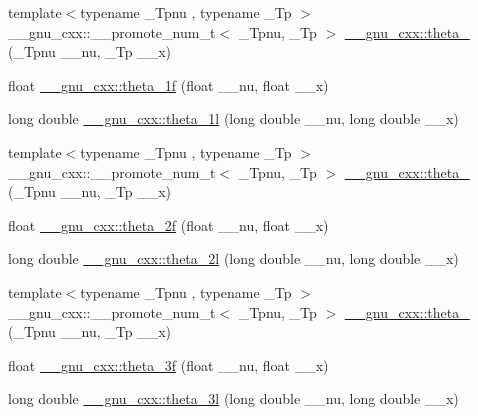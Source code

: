 \begin{DoxyCompactItemize}
\item 
{\footnotesize template$<$typename \+\_\+\+Tpnu , typename \+\_\+\+Tp $>$ }\\\+\_\+\+\_\+gnu\+\_\+cxx\+::\+\_\+\+\_\+promote\+\_\+num\+\_\+t$<$ \+\_\+\+Tpnu, \+\_\+\+Tp $>$ \hyperlink{group__gnu__math__spec__func_ga936eef7d11580bef855f98789bbbfe50}{\+\_\+\+\_\+gnu\+\_\+cxx\+::theta\+\_} (\+\_\+\+Tpnu \+\_\+\+\_\+nu, \+\_\+\+Tp \+\_\+\+\_\+x)
\item 
float \hyperlink{group__gnu__math__spec__func_ga5bbf256b875da28132f9049f5984cb14}{\+\_\+\+\_\+gnu\+\_\+cxx\+::theta\+\_\+1f} (float \+\_\+\+\_\+nu, float \+\_\+\+\_\+x)
\item 
long double \hyperlink{group__gnu__math__spec__func_ga3520684c78771ffa57180060c8b6d1ca}{\+\_\+\+\_\+gnu\+\_\+cxx\+::theta\+\_\+1l} (long double \+\_\+\+\_\+nu, long double \+\_\+\+\_\+x)
\item 
{\footnotesize template$<$typename \+\_\+\+Tpnu , typename \+\_\+\+Tp $>$ }\\\+\_\+\+\_\+gnu\+\_\+cxx\+::\+\_\+\+\_\+promote\+\_\+num\+\_\+t$<$ \+\_\+\+Tpnu, \+\_\+\+Tp $>$ \hyperlink{group__gnu__math__spec__func_ga762aa79fc6c6320d7c6290359a42c2bc}{\+\_\+\+\_\+gnu\+\_\+cxx\+::theta\+\_} (\+\_\+\+Tpnu \+\_\+\+\_\+nu, \+\_\+\+Tp \+\_\+\+\_\+x)
\item 
float \hyperlink{group__gnu__math__spec__func_ga78e832796aedf5159b142801e1184392}{\+\_\+\+\_\+gnu\+\_\+cxx\+::theta\+\_\+2f} (float \+\_\+\+\_\+nu, float \+\_\+\+\_\+x)
\item 
long double \hyperlink{group__gnu__math__spec__func_gac5a30c772d4888442665945e7f3fa017}{\+\_\+\+\_\+gnu\+\_\+cxx\+::theta\+\_\+2l} (long double \+\_\+\+\_\+nu, long double \+\_\+\+\_\+x)
\item 
{\footnotesize template$<$typename \+\_\+\+Tpnu , typename \+\_\+\+Tp $>$ }\\\+\_\+\+\_\+gnu\+\_\+cxx\+::\+\_\+\+\_\+promote\+\_\+num\+\_\+t$<$ \+\_\+\+Tpnu, \+\_\+\+Tp $>$ \hyperlink{group__gnu__math__spec__func_ga1383b7486de1e177f19c45411ed957c3}{\+\_\+\+\_\+gnu\+\_\+cxx\+::theta\+\_} (\+\_\+\+Tpnu \+\_\+\+\_\+nu, \+\_\+\+Tp \+\_\+\+\_\+x)
\item 
float \hyperlink{group__gnu__math__spec__func_ga9a7c967d2a456f1a6aceee9a53f024b1}{\+\_\+\+\_\+gnu\+\_\+cxx\+::theta\+\_\+3f} (float \+\_\+\+\_\+nu, float \+\_\+\+\_\+x)
\item 
long double \hyperlink{group__gnu__math__spec__func_gaf88874ff6c69940d2191f7947d2ea119}{\+\_\+\+\_\+gnu\+\_\+cxx\+::theta\+\_\+3l} (long double \+\_\+\+\_\+nu, long double \+\_\+\+\_\+x)

\end{DoxyCompactItemize}
